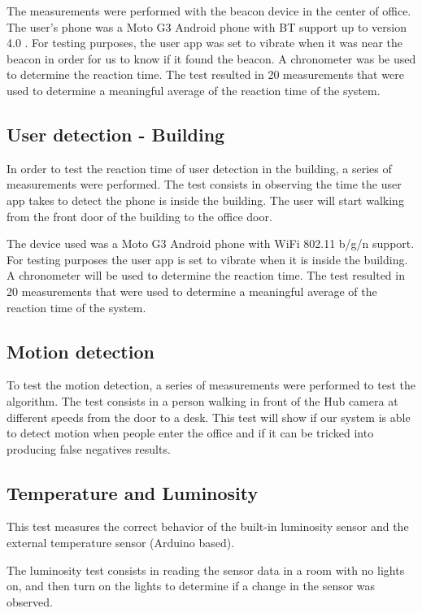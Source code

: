 The measurements were performed with the beacon device in the center of office. The user's phone was a Moto G3 Android phone with BT support up to version 4.0 .
For testing purposes, the user app was set to vibrate when it was near the beacon in order for us to know if it found the beacon. A chronometer was be used to determine the reaction time. The test resulted in 20 measurements that were used to determine a meaningful average of the reaction time of the system.


\subsection{User detection - Building}

In order to test the reaction time of user detection in the building, a series of measurements were performed. The test consists in observing the time the user app takes to detect the phone is inside the building. The user will start walking from the front door of the building to the office door.

The device used was a Moto G3 Android phone with WiFi 802.11 b/g/n support.
For testing purposes the user app is set to vibrate when it is inside the building. A chronometer will be used to determine the reaction time. The test resulted in 20 measurements that were used to determine a meaningful average of the reaction time of the system.



\subsection{Motion detection}

To test the motion detection, a series of measurements were performed to test the algorithm. The test consists in a person walking in front of the Hub camera at different speeds from the door to a desk. This test will show if our system is able to detect motion when people enter the office and if it can be tricked into producing false negatives results.




\subsection{Temperature and Luminosity}

This test measures the correct behavior of the built-in luminosity sensor and the external temperature sensor (Arduino based). 

The luminosity test consists in reading the sensor data in a room with no lights on, and then turn on the lights to determine if a change in the sensor was observed.

